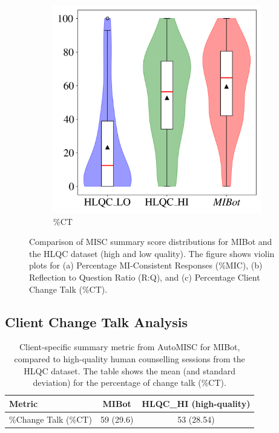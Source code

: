 \begin{figure}[ht]
\begin{subfigure}[b]{0.9\textwidth}
\centering
\includegraphics[height=0.25\textheight, keepaspectratio]{fig/ct.png}
\caption{\%CT}
\end{subfigure}

\caption{Comparison of MISC summary score distributions for MIBot and the HLQC dataset (high and low quality). The figure shows violin plots for (a) Percentage MI-Consistent Responses (\%MIC), (b) Reflection to Question Ratio (R:Q), and (c) Percentage Client Change Talk (\%CT).}
\label{fig:misc_distributions}
\end{figure}


\subsection{Client Change Talk Analysis}



\begin{table}[ht]
  \centering
  \small
  \setlength{\tabcolsep}{4pt}
  \renewcommand{\arraystretch}{1.1}
  \begin{tabular}{@{}lcc@{}}
    \toprule
    \textbf{Metric} & \textbf{MIBot} & \textbf{HLQC\_HI (high-quality)} \\
    \midrule
    \%Change Talk (\%CT) & 59 (29.6) & 53 (28.54) \\
    \bottomrule
  \end{tabular}
  \caption[AutoMISC Client Metrics for MIBot vs. Human]{Client-specific summary metric from AutoMISC for MIBot, compared to high-quality human counselling sessions from the HLQC dataset. The table shows the mean (and standard deviation) for the percentage of change talk (\%CT).}
  \label{table:automisc_summary_client}
\end{table}


